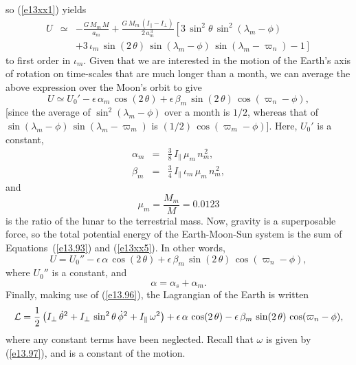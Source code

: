 so (\ref{e13xx1}) yields
\begin{eqnarray}
U &\simeq& - \frac{G\,M_m\,M}{a_m} + \frac{G\,M_m\,(I_\parallel-I_\perp)}{2\,a_m^{\,3}}\left[3\,\sin^2\theta\,\sin^2(\lambda_m-\phi)\right.\nonumber\\[0.5ex]&&\left.
+ 3\,\iota_m\,\sin(2\,\theta)\,\sin(\lambda_m-\phi)\,\sin(\lambda_m-\varpi_n)-1\right]
\end{eqnarray}
to first order in $\iota_m$.
Given that we are interested in the motion of the Earth's axis of rotation on time-scales that are much longer than a month, we can average the above expression over the Moon's orbit to give
\begin{equation}\label{e13xx5}
U \simeq U_0' - \epsilon\,\alpha_m\,\cos(2\,\theta) + \epsilon\,\beta_m\,\sin(2\,\theta)\,\cos(\varpi_n-\phi),
\end{equation}
[since the average of $\sin^2(\lambda_m-\phi)$ over a month is $1/2$, whereas that of $\sin(\lambda_m-\phi)\,\sin(\lambda_m-\varpi_m)$
is $(1/2)\,\cos(\varpi_m-\phi)$]. Here, $U_0'$ is a constant,
\begin{eqnarray}
\alpha_m &=& \frac{3}{8}\,I_\parallel\,\mu_m\,n_m^{\,2},\\[0.5ex]
\beta_m &=& \frac{3}{4}\,I_\parallel\,\iota_m\,\mu_m\,n_m^{\,2},
\end{eqnarray}
 and 
  \begin{equation}
  \mu_m=\frac{M_m}{M} = 0.0123
  \end{equation}
  is the ratio of the lunar to the terrestrial mass. 
  Now, gravity is a superposable force, so the total potential energy of the Earth-Moon-Sun system is
 the sum of Equations~(\ref{e13.93}) and (\ref{e13xx5}). In other words,
\begin{equation}
U = U_0'' -\epsilon\,\alpha\,\cos(2\,\theta) +\epsilon\,\beta_m\,\sin(2\,\theta)\,\cos(\varpi_n-\phi),
\end{equation}
where $U_0''$ is a constant, and 
\begin{equation}
\alpha=\alpha_s+\alpha_m. 
\end{equation}
Finally, making use of (\ref{e13.96}), the Lagrangian of the Earth is written
\begin{equation}
{\cal L}= \frac{1}{2}\left(I_\perp\,\dot{\theta}^2 + I_\perp\,\sin^2\theta\,\dot{\phi}^2 + I_\parallel\,\omega^2\right) +\epsilon\,\alpha\,\cos(2\,\theta)- \epsilon\,\beta_m\,\sin(2\,\theta)\,\cos(\varpi_n-\phi),
\end{equation}
where any constant terms have been neglected. Recall that $\omega$  is  given by (\ref{e13.97}), and is a constant of the motion. 

